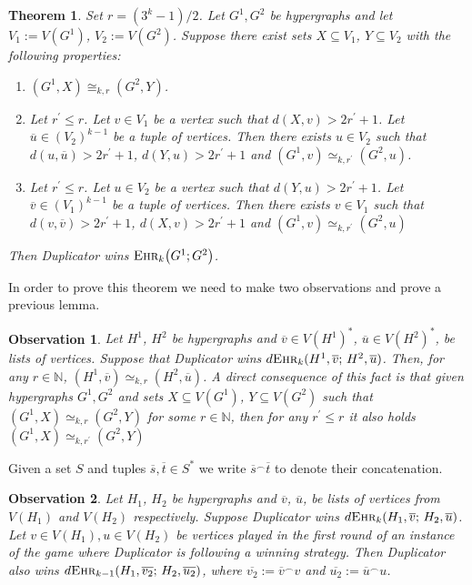 \documentclass[12pt,notitlepage,a4paper]{article}
\newtheorem{theorem}{Theorem}[section]
\newtheorem{obs}{Observation}[section]
\theoremstyle{definition}
\newcommand{\N}{\mathbb{N}}
\newcommand{\ehr}{\textsc{Ehr}}
\begin{document}
\begin{theorem}\label{ThmDuplicator}
	Set $r=(3^k-1)/2$.
	Let $G^1,G^2$ be hypergraphs and let $V_1:=V(G^1)$, $V_2:=
	V(G^2)$.
	Suppose there exist
	sets $X\subseteq V_1$, $Y\subseteq V_2$ with the 
	following properties:
	\begin{enumerate}
		\item[(1)] $(G^1,X)\cong_{k,r} (G^2,Y)$.
		\item[(2)] Let $r^\prime\leq r$. Let $v\in V_1$ be
		a vertex such that $d(X,v)> 2r^\prime + 1$. Let 
		$\overline{u}\in (V_2)^{k-1}$ be a tuple of vertices. 
		Then there exists $u\in V_2$ such that 
		$d(u,\overline{u})>2r^\prime+1$,
		$d(Y,u)>2r^\prime +1$ and
		$(G^1,v)\simeq_{k,r^\prime} (G^2,u)$.	
		\item[(3)] Let $r^\prime\leq r$. Let $u\in V_2$ be
		a vertex such that $d(Y,u)> 2r^\prime + 1$. Let 
		$\overline{v}\in (V_1)^{k-1}$ be a tuple of vertices. 
		Then there exists $v\in V_1$ such that 
		$d(v,\overline{v})>2r^\prime+1$,
		$d(X,v)>2r^\prime +1$ and
		$(G^1,v)\simeq_{k,r^\prime} (G^2,u)$
	\end{enumerate}
	Then Duplicator wins $\ehr_k\big(G^1;G^2\big)$.
\end{theorem}

In order to prove this theorem we need to make two observations
and prove a previous lemma. 

\begin{obs} \label{obs1}
	Let $H^1$, $H^2$ be hypergraphs and 
	$\overline{v}\in V(H^1)^*$, $\overline{u}\in V(H^2)^*$,
	be lists of vertices. Suppose that
	Duplicator wins $d\ehr_k(H^1,\overline{v}; \, H^2,\overline{u})$.
	Then, for any $r\in \N$, $(H^1, \overline{v})\simeq_{k,r} 
	(H^2,\overline{u})$. A direct consequence of this fact 
	is that 
	given hypergraphs $G^1, G^2$ and sets
	$X\subseteq V(G^1)$, $Y\subseteq V(G^2)$ such that
	$(G^1,X)\simeq_{k,r} (G^2,Y)$ for some $r\in \N$, 
	then for any $r^\prime \leq r$ it also holds 
	$(G^1,X)\simeq_{k,r^\prime} (G^2,Y)$
\end{obs}

Given a set $S$ and tuples $\overline{s},\overline{t}\in S^*$
we write $\overline{s}^\frown \overline{t}$ to denote their 
concatenation.  

\begin{obs} \label{obs2}
	Let $H_1$, $H_2$ be hypergraphs and 
	$\overline{v}$, $\overline{u}$, be lists of vertices
	from $V(H_1)$ and $V(H_2)$ respectively. Suppose 
	Duplicator wins $d\ehr_k(H_1,\overline{v};\,H_2,\overline{u})$. 
	Let $v\in V(H_1),u\in V(H_2)$ be vertices
	played in the first round of an instance of the game 
	where Duplicator is following a winning strategy. Then 
	Duplicator also wins $d\ehr_{k-1}(H_1,\overline{v_2}; \,
	H_2,\overline{u_2})$, where $\overline{v_2}:=\overline{v}^\frown v$
	and $\overline{u_2}:=\overline{u}^\frown u$.
\end{obs}
\end{document}
